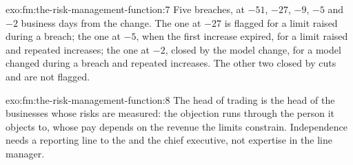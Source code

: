 \begin{solution}{exo:fm:the-risk-management-function:7}
Five breaches, at $-51$, $-27$, $-9$, $-5$ and $-2$ business days from the change. The one at $-27$ is flagged for a limit raised during a
breach; the one at $-5$, when the first increase expired, for a limit raised and repeated increases; the one at $-2$, closed by the model change, for
a model changed during a breach and repeated increases. The other two closed by cuts and are not flagged.
\end{solution}

\begin{solution}{exo:fm:the-risk-management-function:8}
The head of trading is the head of the businesses whose risks are measured: the objection runs through the person it objects to, whose pay
depends on the revenue the limits constrain. Independence needs a reporting line to the  and the chief executive, not expertise in
the line manager.
\end{solution}

